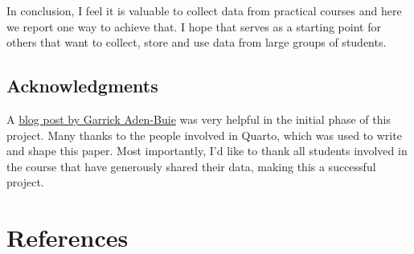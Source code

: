 \documentclass[
]{agujournal2019}
\begin{document}
In conclusion, I feel it is valuable to collect data from practical
courses and here we report one way to achieve that. I hope that serves
as a starting point for others that want to collect, store and use data
from large groups of students.

\hypertarget{acknowledgments}{%
\subsection*{Acknowledgments}\label{acknowledgments}}

A
\href{https://www.garrickadenbuie.com/blog/use-google-forms-and-r-to-track-data-easily/}{blog
post by Garrick Aden-Buie} was very helpful in the initial phase of this
project. Many thanks to the people involved in Quarto, which was used to
write and shape this paper. Most importantly, I'd like to thank all
students involved in the course that have generously shared their data,
making this a successful project.

\hypertarget{references}{%
\section*{References}\label{references}}
\end{document}
